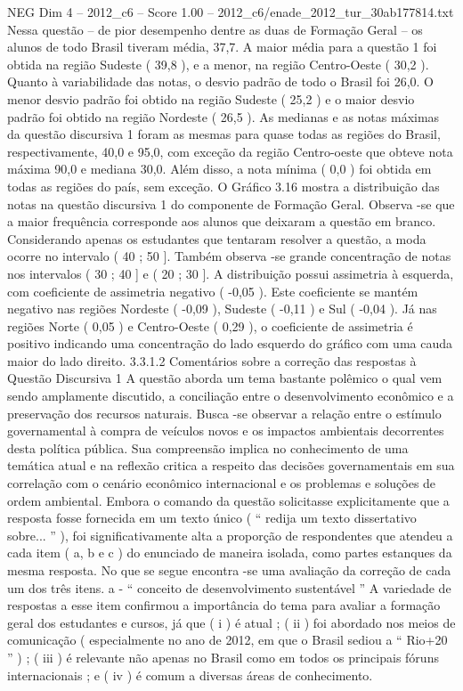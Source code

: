 \begin{textsample}{NEG Dim 4 – 2012\_c6 – Score 1.00 – 2012\_c6/enade\_2012\_tur\_30ab177814.txt}
Nessa questão – de pior desempenho dentre as duas de Formação Geral – os alunos de todo Brasil tiveram média, 37,7.
A maior média para a questão 1 foi obtida na região Sudeste ( 39,8 ), e a menor, na região Centro-Oeste ( 30,2 ).
Quanto à variabilidade das notas, o desvio padrão de todo o Brasil foi 26,0.
O menor desvio padrão foi obtido na região Sudeste ( 25,2 ) e o maior desvio padrão foi obtido na região Nordeste ( 26,5 ).
As medianas e as notas máximas da questão discursiva 1 foram as mesmas para quase todas as regiões do Brasil, respectivamente, 40,0 e 95,0, com exceção da região Centro-oeste que obteve nota máxima 90,0 e mediana 30,0.
Além disso, a nota mínima ( 0,0 ) foi obtida em todas as regiões do país, sem exceção.
O Gráfico 3.16 mostra a distribuição das notas na questão discursiva 1 do componente de Formação Geral.
Observa -se que a maior frequência corresponde aos alunos que deixaram a questão em branco.
Considerando apenas os estudantes que tentaram resolver a questão, a moda ocorre no intervalo ( 40 ; 50 ].
Também observa -se grande concentração de notas nos intervalos ( 30 ; 40 ] e ( 20 ; 30 ].
A distribuição possui assimetria à esquerda, com coeficiente de assimetria negativo ( -0,05 ).
Este coeficiente se mantém negativo nas regiões Nordeste ( -0,09 ), Sudeste ( -0,11 ) e Sul ( -0,04 ).
Já nas regiões Norte ( 0,05 ) e Centro-Oeste ( 0,29 ), o coeficiente de assimetria é positivo indicando uma concentração do lado esquerdo do gráfico com uma cauda maior do lado direito. 3.3.1.2 Comentários sobre a correção das respostas à Questão Discursiva 1 A questão aborda um tema bastante polêmico o qual vem sendo amplamente discutido, a conciliação entre o desenvolvimento econômico e a preservação dos recursos naturais.
Busca -se observar a relação entre o estímulo governamental à compra de veículos novos e os impactos ambientais decorrentes desta política pública.
Sua compreensão implica no conhecimento de uma temática atual e na reflexão critica a respeito das decisões governamentais em sua correlação com o cenário econômico internacional e os problemas e soluções de ordem ambiental.
Embora o comando da questão solicitasse explicitamente que a resposta fosse fornecida em um texto único ( “ redija um texto dissertativo sobre... ” ), foi significativamente alta a proporção de respondentes que atendeu a cada item ( a, b e c ) do enunciado de maneira isolada, como partes estanques da mesma resposta.
No que se segue encontra -se uma avaliação da correção de cada um dos três itens. a - “ conceito de desenvolvimento sustentável ” A variedade de respostas a esse item confirmou a importância do tema para avaliar a formação geral dos estudantes e cursos, já que ( i ) é atual ; ( ii ) foi abordado nos meios de comunicação ( especialmente no ano de 2012, em que o Brasil sediou a “ Rio+20 ” ) ; ( iii ) é relevante não apenas no Brasil como em todos os principais fóruns internacionais ; e ( iv ) é comum a diversas áreas de conhecimento.

\end{textsample}
